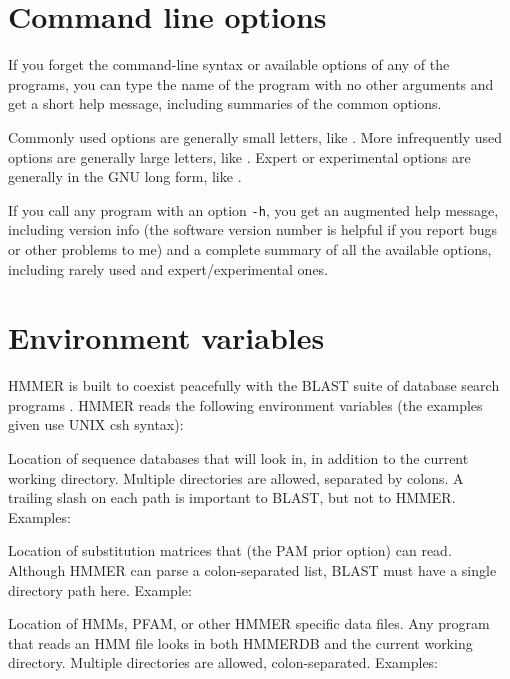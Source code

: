 \section{Command line options}

If you forget the command-line syntax or available options of any of
the programs, you can type the name of the program with no other
arguments and get a short help message, including summaries of the
common options.

Commonly used options are generally small letters, like .
More infrequently used options are generally large letters, like
. Expert or experimental options are generally in the GNU long form,
like .

If you call any program with an option {\tt -h}, you get an augmented
help message, including version info (the software version number is
helpful if you report bugs or other problems to me) and a complete
summary of all the available options, including rarely used and
expert/experimental ones.

\section {Environment variables}

HMMER is built to coexist peacefully with the BLAST suite of database
search programs \cite{Altschul91}. HMMER reads the following
environment variables (the examples given use UNIX csh syntax):

\begin{wideitem}
\item [\emprog{BLASTDB}] Location of sequence databases that
	 will look in, in addition to the current
	working directory.
	Multiple directories are allowed, separated by colons. A
	trailing slash on each path is important to BLAST, but not to HMMER.\\
	Examples: \\

\item [\emprog{BLASTMAT}] Location of substitution matrices that
	 (the PAM prior option) can read.
	Although HMMER can parse a colon-separated list, BLAST must
	have a single directory path here.
	Example:\\

\item [\emprog{HMMERDB}] Location of HMMs, PFAM, or other HMMER
	specific data files. Any program that reads an HMM file
	looks in both HMMERDB and the current working directory.
	Multiple directories are allowed, colon-separated.
	Examples:\\
\end{wideitem}

